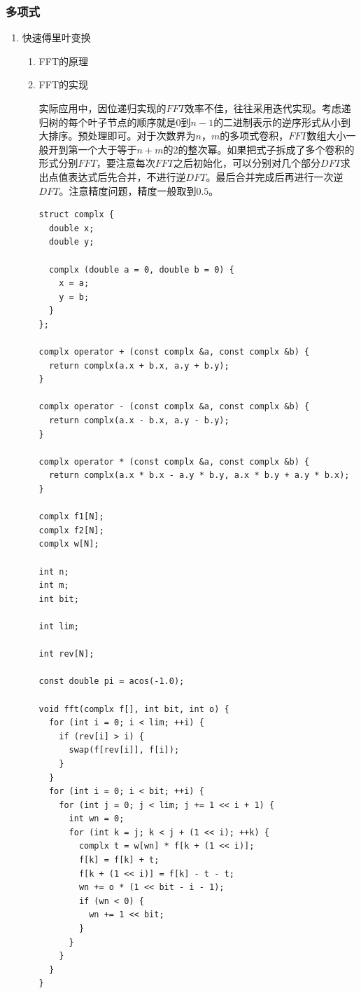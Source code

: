 \documentclass[11pt]{article}
\begin{document}
\subsubsection{多项式}
\label{sec:org91f4be6}
\begin{enumerate}
\item 快速傅里叶变换
\label{sec:org9bdbb23}
\begin{enumerate}
\item FFT的原理
\label{sec:orgbe29cca}

\item FFT的实现
\label{sec:org2831d6f}

实际应用中，因位递归实现的\(FFT\)效率不佳，往往采用迭代实现。考虑递归树的每个叶子节点的顺序就是\(0\)到\(n-1\)的二进制表示的逆序形式从小到大排序。预处理即可。对于次数界为\(n\)，\(m\)的多项式卷积，\(FFT\)数组大小一般开到第一个大于等于\(n+m\)的\(2\)的整次幂。如果把式子拆成了多个卷积的形式分别\(FFT\)，要注意每次\(FFT\)之后初始化，可以分别对几个部分\(DFT\)求出点值表达式后先合并，不进行逆\(DFT\)。最后合并完成后再进行一次逆\(DFT\)。注意精度问题，精度一般取到\(0.5\)。

\begin{verbatim}
struct complx {
  double x;
  double y;

  complx (double a = 0, double b = 0) {
    x = a;
    y = b;
  }
};

complx operator + (const complx &a, const complx &b) {
  return complx(a.x + b.x, a.y + b.y);
}

complx operator - (const complx &a, const complx &b) {
  return complx(a.x - b.x, a.y - b.y);
}

complx operator * (const complx &a, const complx &b) {
  return complx(a.x * b.x - a.y * b.y, a.x * b.y + a.y * b.x);
}

complx f1[N];
complx f2[N];
complx w[N];

int n;
int m;
int bit;

int lim;

int rev[N];

const double pi = acos(-1.0);

void fft(complx f[], int bit, int o) {
  for (int i = 0; i < lim; ++i) {
    if (rev[i] > i) {
      swap(f[rev[i]], f[i]);
    }
  }
  for (int i = 0; i < bit; ++i) {
    for (int j = 0; j < lim; j += 1 << i + 1) {
      int wn = 0;
      for (int k = j; k < j + (1 << i); ++k) {
        complx t = w[wn] * f[k + (1 << i)];
        f[k] = f[k] + t;
        f[k + (1 << i)] = f[k] - t - t;
        wn += o * (1 << bit - i - 1);
        if (wn < 0) {
          wn += 1 << bit;
        }
      }
    }
  }
}


\end{verbatim}
\end{enumerate}
\end{enumerate}
\end{document}
